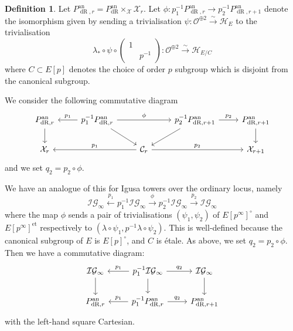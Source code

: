 \documentclass[10pt, oneside]{amsart}
\numberwithin{equation}{subsection}
\theoremstyle{definition}
\newtheorem{definition}[equation]{Definition}
\theoremstyle{remark}
\newcommand{\opn}[1]{\operatorname{#1}}
\begin{document}
\begin{definition} \label{DefinitionOfPhiTopCorr}
    Let $P_{\opn{dR}, r}^{\opn{an}} = P_{\opn{dR}}^{\opn{an}} \times_{\mathcal{X}} \mathcal{X}_r$. Let $\phi \colon p_1^{-1}P_{\opn{dR}, r}^{\opn{an}} \to p_2^{-1}P_{\opn{dR}, r+1}^{\opn{an}}$ denote the isomorphism given by sending a trivialisation $\psi \colon \mathcal{O}^{\oplus 2} \xrightarrow{\sim} \mathcal{H}_E$ to the trivialisation
    \[
    \lambda_* \circ \psi \circ \left( \begin{smallmatrix} 1 & \\ & p^{-1} \end{smallmatrix} \right) \colon \mathcal{O}^{\oplus 2} \xrightarrow{\sim} \mathcal{H}_{E/C}
    \]
    where $C \subset E[p]$ denotes the choice of order $p$ subgroup which is disjoint from the canonical subgroup. 
\end{definition}

We consider the following commutative diagram
\[
\begin{tikzcd}
{P_{\opn{dR}, r}^{\opn{an}}} \arrow[d] & {p_1^{-1}P_{\opn{dR}, r}^{\opn{an}}} \arrow[l, "p_1"'] \arrow[rd] \arrow[rr, "\phi"] &                                                    & {p_2^{-1}P_{\opn{dR}, r+1}^{\opn{an}}} \arrow[r, "p_2"] \arrow[ld] & {P_{\opn{dR}, r+1}^{\opn{an}}} \arrow[d] \\
\mathcal{X}_r                          &                                                                                      & \mathcal{C}_r \arrow[ll, "p_1"'] \arrow[rr, "p_2"] &                                                                    & \mathcal{X}_{r+1}                       
\end{tikzcd}
\]
and we set $q_2 = p_2 \circ \phi$.

We have an analogue of this for Igusa towers over the ordinary locus, namely 
\[
\mathcal{IG}_{\infty} \xleftarrow{p_1} p_1^{-1}\mathcal{IG}_{\infty} \xrightarrow{\phi} p_2^{-1}\mathcal{IG}_{\infty} \xrightarrow{p_2} \mathcal{IG}_{\infty} 
\]
where the map $\phi$ sends a pair of trivialisations $(\psi_1, \psi_2)$ of $E[p^{\infty}]^{\circ}$ and $E[p^{\infty}]^{\opn{et}}$ respectively to $(\lambda \circ \psi_1, p^{-1}\lambda \circ \psi_2)$. This is well-defined because the canonical subgroup of $E$ is $E[p]^{\circ}$, and $C$ is \'{e}tale. As above, we set $q_2 = p_2 \circ \phi$. Then we have a commutative diagram:
\[
\begin{tikzcd}
{\mathcal{IG}_{\infty}} \arrow[d] & {p_1^{-1}\mathcal{IG}_{\infty}} \arrow[l, "p_1"'] \arrow[r, "q_2"] \arrow[d] & {\mathcal{IG}_{\infty}} \arrow[d] \\
P_{\opn{dR}, r}^{\opn{an}}        & p_1^{-1}P_{\opn{dR}, r}^{\opn{an}} \arrow[l, "p_1"'] \arrow[r, "q_2"]     & P_{\opn{dR}, r+1}^{\opn{an}}       
\end{tikzcd}
\]
with the left-hand square Cartesian.
\end{document}
